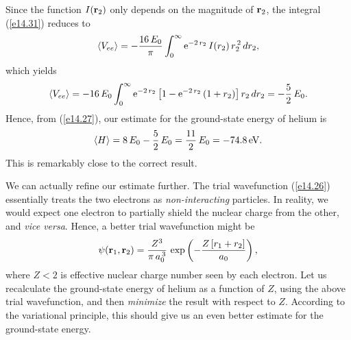 Since the function $I({\bf r}_2)$ only depends on the magnitude of ${\bf r}_2$,
the integral (\ref{e14.31}) reduces to
\begin{equation}
\langle V_{ee}\rangle = -\frac{16\,E_0}{\pi}\int_0^\infty
{\rm e}^{-2\,r_2}\,I(r_2)\,r_2^{\,2}\,dr_2,
\end{equation}
which yields
\begin{equation}
\langle V_{ee}\rangle = -16\,E_0\int_{0}^\infty
{\rm e}^{-2\,r_2}\left[1-{\rm e}^{-2\,r_2}\,(1+r_2)\right]r_2\,dr_2=
-\frac{5}{2}\,E_0.
\end{equation}
Hence, from (\ref{e14.27}), our estimate for the ground-state
energy of helium is
\begin{equation}\label{e14.43}
\langle H\rangle = 8\,E_0 - \frac{5}{2}\,E_0 = \frac{11}{2}\,E_0 = -74.8\,{\rm eV}.
\end{equation}
This is remarkably close to the correct result.

We can actually refine our estimate further. The trial wavefunction (\ref{e14.26}) essentially treats the two electrons as 
{\em non-interacting}\/ particles. In
reality, we would expect one electron to partially shield the nuclear
charge from the other, and {\em vice versa}. Hence, a better
trial wavefunction might be
\begin{equation}\label{e14.44}
\psi({\bf r}_1, {\bf r}_2) = 
\frac{Z^3}{\pi\,a_0^{\,3}}\,\exp\left(- \frac{Z\,[r_1+r_2]}{a_0}\right),
\end{equation}
where $Z<2$ is effective nuclear charge number seen by each
electron. Let us recalculate the ground-state energy of helium
as a function of $Z$, using the above trial wavefunction, and then
{\em minimize}\/ the result with respect to $Z$. According to
the variational principle, this should give us an even  better estimate
for the ground-state energy.

